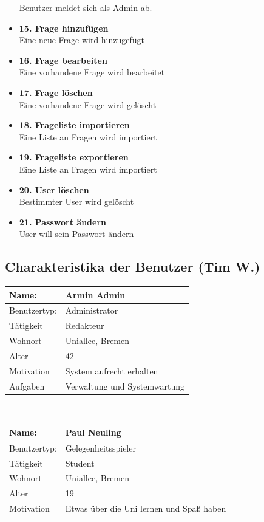 \documentclass[fontsize=12pt,paper=a4,twoside]{scrartcl}
\begin{document}
\begin{itemize}
	Benutzer meldet sich als Admin ab.
	\item \textbf{15. Frage hinzufügen}\\
	Eine neue Frage wird hinzugefügt
	\item \textbf{16. Frage bearbeiten}\\
	Eine vorhandene Frage wird bearbeitet
	\item \textbf{17. Frage löschen}\\
	Eine vorhandene Frage wird gelöscht
		\item \textbf{18. Frageliste importieren}\\
		Eine Liste an Fragen wird importiert
		\item \textbf{19. Frageliste exportieren}\\
		Eine Liste an Fragen wird importiert
	\item \textbf{20. User löschen}\\
	Bestimmter User wird gelöscht
	\item \textbf{21. Passwort ändern}\\
	User will sein Passwort ändern	
\end{itemize}

\subsection{Charakteristika der Benutzer (Tim W.)}
	\begin{tabular}{|p{}|p{}|}\hline
       \textbf{Name:} &  \textbf{Armin Admin}\\\hline
       Benutzertyp: & Administrator\\\hline
       Tätigkeit	& Redakteur\\\hline
       Wohnort & Uniallee, Bremen\\\hline
       Alter	 & 42\\\hline
       Motivation & System aufrecht erhalten\\\hline
       Aufgaben & Verwaltung und Systemwartung\\\hline
    \end{tabular}\\
        
    	\begin{tabular}{|p{}|p{}|}\hline
        \textbf{Name:} &  \textbf{Paul Neuling}\\\hline
       Benutzertyp: & Gelegenheitsspieler \\\hline
       Tätigkeit	& Student\\\hline
       Wohnort & Uniallee, Bremen\\\hline
       Alter	 & 19\\\hline
       Motivation & Etwas über die Uni lernen und Spaß haben\\\hline
    \end{tabular}\\
    
\end{document}
